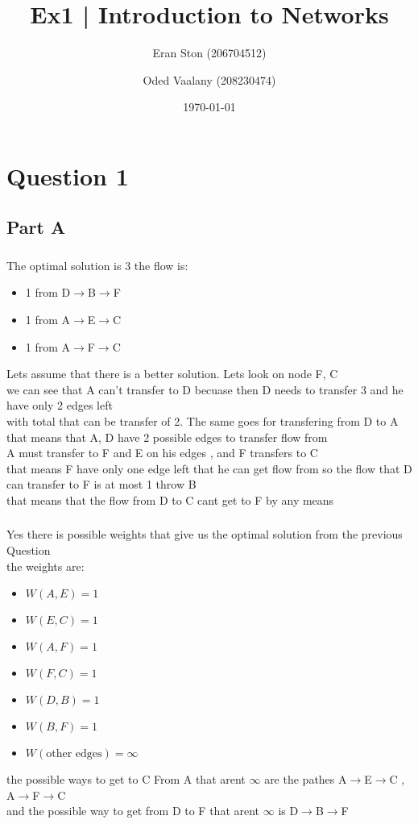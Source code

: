 \documentclass{article}
\title{Ex1 | Introduction to Networks}
\author{Eran Ston (206704512) \and Oded Vaalany (208230474)}
\date{\today}
\begin{document}
\maketitle

\section{Question 1}
\subsection{Part A}
\subsubsection{}
The optimal solution is 3 
the flow is:
\begin{itemize}
    \item 1 from D$\rightarrow$B$\rightarrow$F
    \item 1 from A$\rightarrow$E$\rightarrow$C
    \item 1 from A$\rightarrow$F$\rightarrow$C
\end{itemize}


Lets assume that there is a better solution. Lets look on node F, C\\
we can see that A can't transfer to D becuase then D needs to transfer 3 and he have only 2 edges left\\
with total that can be transfer of 2. The same goes for transfering from D to A\\
that means that A, D have 2 possible edges to transfer flow from\\
A must transfer to F and E on his edges
, and F transfers to C\\
that means F have only one edge left that he can get flow from so the flow that D can transfer to F is at most 1 throw B\\
that means that the flow from D to C cant get to F by any means

\subsubsection{}
Yes there is possible weights that give us the optimal solution from the previous Question\\
the weights are:
\begin{itemize}
    \item $W(A,E) = 1$
    \item $W(E,C) = 1$
    \item $W(A,F) = 1$
    \item $W(F,C) = 1$
    \item $W(D,B) = 1$
    \item $W(B,F) = 1$    
    \item $W(\text{other edges}) = \infty$
\end{itemize}
the possible ways to get to C From A that arent $\infty$ are the pathes A$\rightarrow$E$\rightarrow$C , A$\rightarrow$F$\rightarrow$C\\
and the possible way to get from D to F that arent $\infty$ is D$\rightarrow$B$\rightarrow$F\\
\end{document}
